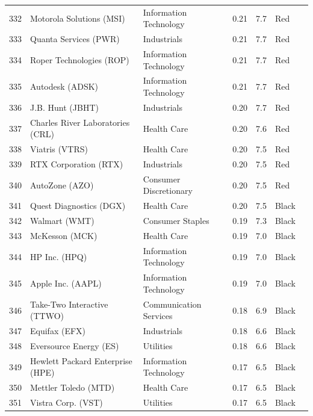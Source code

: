 \documentclass[11pt,a4paper]{article}
\begin{document}
{\begin{longtable}{r p{4.4cm} p{2.8cm} r r l l}
332 & Motorola Solutions (MSI) & Information Technology & 0.21 & 7.7 & \cellcolor[HTML]{F4B6B6}Red &  \\
333 & Quanta Services (PWR) & Industrials & 0.21 & 7.7 & \cellcolor[HTML]{F4B6B6}Red &  \\
334 & Roper Technologies (ROP) & Information Technology & 0.21 & 7.7 & \cellcolor[HTML]{F4B6B6}Red &  \\
335 & Autodesk (ADSK) & Information Technology & 0.21 & 7.7 & \cellcolor[HTML]{F4B6B6}Red &  \\
336 & J.B. Hunt (JBHT) & Industrials & 0.20 & 7.7 & \cellcolor[HTML]{F4B6B6}Red &  \\
337 & Charles River Laboratories (CRL) & Health Care & 0.20 & 7.6 & \cellcolor[HTML]{F4B6B6}Red &  \\
338 & Viatris (VTRS) & Health Care & 0.20 & 7.5 & \cellcolor[HTML]{F4B6B6}Red &  \\
339 & RTX Corporation (RTX) & Industrials & 0.20 & 7.5 & \cellcolor[HTML]{F4B6B6}Red &  \\
340 & AutoZone (AZO) & Consumer Discretionary & 0.20 & 7.5 & \cellcolor[HTML]{F4B6B6}Red &  \\
341 & Quest Diagnostics (DGX) & Health Care & 0.20 & 7.5 & \cellcolor[HTML]{BFBFBF}Black &  \\
342 & Walmart (WMT) & Consumer Staples & 0.19 & 7.3 & \cellcolor[HTML]{BFBFBF}Black &  \\
343 & McKesson (MCK) & Health Care & 0.19 & 7.0 & \cellcolor[HTML]{BFBFBF}Black &  \\
344 & HP Inc. (HPQ) & Information Technology & 0.19 & 7.0 & \cellcolor[HTML]{BFBFBF}Black &  \\
345 & Apple Inc. (AAPL) & Information Technology & 0.19 & 7.0 & \cellcolor[HTML]{BFBFBF}Black &  \\
346 & Take-Two Interactive (TTWO) & Communication Services & 0.18 & 6.9 & \cellcolor[HTML]{BFBFBF}Black &  \\
347 & Equifax (EFX) & Industrials & 0.18 & 6.6 & \cellcolor[HTML]{BFBFBF}Black &  \\
348 & Eversource Energy (ES) & Utilities & 0.18 & 6.6 & \cellcolor[HTML]{BFBFBF}Black &  \\
349 & Hewlett Packard Enterprise (HPE) & Information Technology & 0.17 & 6.5 & \cellcolor[HTML]{BFBFBF}Black &  \\
350 & Mettler Toledo (MTD) & Health Care & 0.17 & 6.5 & \cellcolor[HTML]{BFBFBF}Black &  \\
351 & Vistra Corp. (VST) & Utilities & 0.17 & 6.5 & \cellcolor[HTML]{BFBFBF}Black &  \\

\end{longtable}}
\end{document}
